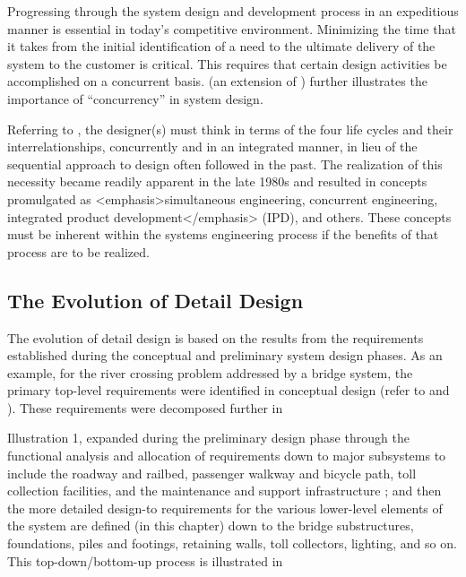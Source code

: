 Progressing through the system design and development process in an expeditious manner is essential in today’s competitive environment. Minimizing the time that it takes from the initial identification of a need to the ultimate delivery of the system to the customer is critical. This requires that certain design activities be accomplished on a concurrent basis. (an extension of ) further illustrates the importance of ``concurrency'' in system design.

Referring to , the designer(s) must think in terms of the four life cycles and their interrelationships, concurrently and in an integrated manner, in lieu of the sequential approach to design often followed in the past. The realization of this necessity became readily apparent in the late 1980s and resulted in concepts promulgated as <emphasis>simultaneous engineering, concurrent engineering, integrated product development</emphasis> (IPD), and others. These concepts must be inherent within the systems engineering process if the benefits of that process are to be realized.

\subsection{The Evolution of Detail Design}

The evolution of detail design is based on the results from the requirements established during the conceptual and preliminary system design phases. As an example, for the river crossing problem addressed by a bridge system, the primary top-level requirements were identified in conceptual design (refer to  and ). These requirements were decomposed further in 

Illustration 1, expanded during the preliminary design phase through the functional analysis and allocation of requirements down to major subsystems to include the roadway and railbed, passenger walkway and bicycle path, toll collection facilities, and the maintenance and support infrastructure ; and then the more detailed design-to requirements for the various lower-level elements of the system are defined (in this chapter) down to the bridge substructures, foundations, piles and footings, retaining walls, toll collectors, lighting, and so on. This top-down/bottom-up process is illustrated in 

